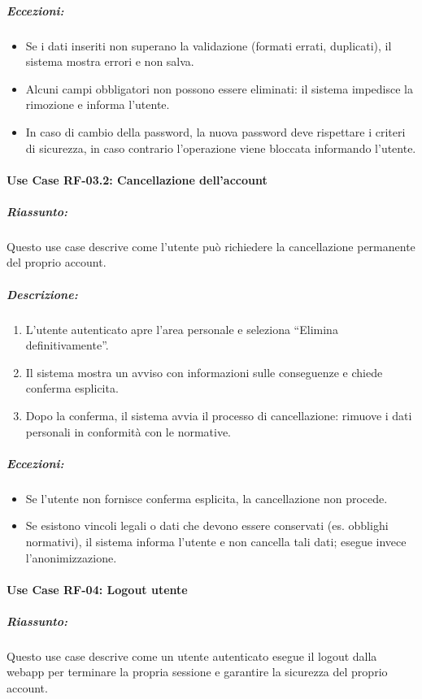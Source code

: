 \subparagraph*{Eccezioni:}
\begin{itemize}
    \item Se i dati inseriti non superano la validazione (formati errati, duplicati), il sistema mostra errori e non salva.
    \item Alcuni campi obbligatori non possono essere eliminati: il sistema impedisce la rimozione e informa l’utente.
    \item In caso di cambio della password, la nuova password deve rispettare i criteri di sicurezza, in caso contrario l'operazione viene bloccata informando l'utente. 
\end{itemize}

\paragraph*{Use Case RF-03.2: Cancellazione dell'account}
\subparagraph*{Riassunto:}
Questo use case descrive come l'utente può richiedere la cancellazione permanente del proprio account.

\subparagraph*{Descrizione:}
\begin{enumerate}
    \item L’utente autenticato apre l’area personale e seleziona ``Elimina definitivamente''.
    \item Il sistema mostra un avviso con informazioni sulle conseguenze e chiede conferma esplicita.
    \item Dopo la conferma, il sistema avvia il processo di cancellazione: rimuove i dati personali in conformità con le normative.
\end{enumerate}

\subparagraph*{Eccezioni:}
\begin{itemize}
    \item Se l’utente non fornisce conferma esplicita, la cancellazione non procede.
    \item Se esistono vincoli legali o dati che devono essere conservati (es. obblighi normativi), il sistema informa l’utente e non cancella tali dati; esegue invece l’anonimizzazione.
\end{itemize}

\paragraph*{Use Case RF-04: Logout utente}
\subparagraph*{Riassunto:}
Questo use case descrive come un utente autenticato esegue il logout dalla webapp per terminare la propria sessione e garantire la sicurezza del proprio account.

